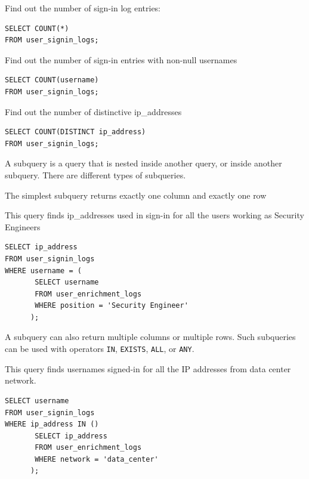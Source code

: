 \documentclass[9pt]{innovativeinnovation-cheatsheet}
\begin{document}
\begin{multicols}{3}
Find out the number of sign-in log entries:
\vspace{-8pt}
\begin{lstlisting}[style=code_style]
SELECT COUNT(*)
FROM user_signin_logs;
\end{lstlisting}

Find out the number of sign-in entries with non-null usernames
\vspace{-8pt}
\begin{lstlisting}[style=code_style]
SELECT COUNT(username)
FROM user_signin_logs;
\end{lstlisting}

Find out the number of distinctive ip\_addresses
\vspace{-8pt}
\begin{lstlisting}[style=code_style]
SELECT COUNT(DISTINCT ip_address)
FROM user_signin_logs;
\end{lstlisting}


A subquery is a query that is nested inside another query, or inside another subquery. There are different types of subqueries. 

The simplest subquery returns exactly one column and exactly one row

This query finds ip\_addresses used in sign-in for all the users working as Security Engineers
\vspace{-8pt}
\begin{lstlisting}[style=code_style]
SELECT ip_address 
FROM user_signin_logs
WHERE username = (
       SELECT username
       FROM user_enrichment_logs
       WHERE position = 'Security Engineer'
      );
\end{lstlisting}

A subquery can also return multiple columns or multiple rows. Such subqueries can be used with operators \texttt{IN}, \texttt{EXISTS}, \texttt{ALL}, or \texttt{ANY}.

This query finds usernames signed-in for all the IP addresses from data center network.
\vspace{-8pt}
\begin{lstlisting}[style=code_style]
SELECT username 
FROM user_signin_logs
WHERE ip_address IN ()
       SELECT ip_address
       FROM user_enrichment_logs
       WHERE network = 'data_center'
      );
\end{lstlisting}


\end{multicols}
\end{document}

